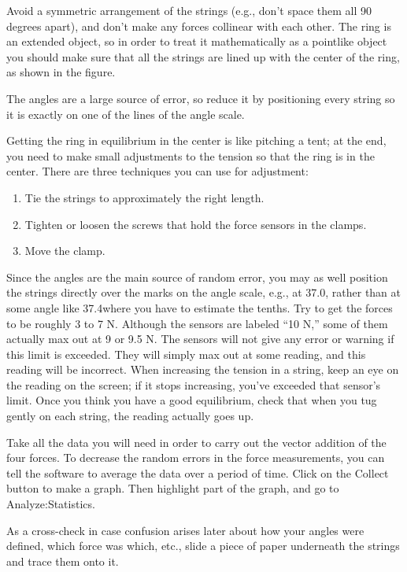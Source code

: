 
Avoid a symmetric arrangement of
the strings (e.g., don't space them all 90 degrees apart), and
don't make any forces collinear with each other. 
The ring is an extended object, so in order to treat it
mathematically as a pointlike object you should make sure
that all the strings are lined up with the center of the
ring, as shown in the figure.

The angles are a large source of error, so reduce it by positioning every string so it is exactly 
on one of the lines of the angle scale.

Getting the ring in equilibrium in the center is like pitching a tent; at the end, you need
to make small adjustments to the tension so that the ring is in the center.
There are three techniques you can use for
adjustment:

\begin{enumerate}
\item Tie the strings to approximately the right length.
\item Tighten or loosen the screws that hold the force sensors in the clamps.
\item Move the clamp.
\end{enumerate}

Since the angles are the main source
of random error, you may as well position the strings directly over the marks on the angle scale,
e.g., at 37.0\degunit, rather than at some angle like 37.4\degunit where you have to estimate the tenths.
Try to get the forces to be roughly 3 to 7 N.
Although the sensors are labeled ``10 N,'' some of them actually max out at 9 or 9.5 N.
The sensors will not give any
error or warning if this limit is exceeded. They will simply max out at some
reading, and this reading will be incorrect. When increasing the tension in a string, keep an eye
on the reading on the screen; if it stops increasing, you've exceeded that sensor's limit.
Once you think you have a good equilibrium, check that when you tug gently on each string, the
reading actually goes up.

Take all the data you will need in order to carry out the vector addition of the four forces.
To decrease the random errors in the force measurements, you can tell the software to average
the data over a period of time. Click on the Collect button to make a graph.
Then highlight part of the graph, and go to Analyze:Statistics.

As a cross-check in case confusion arises later about how your angles were defined, which
force was which, etc., slide a piece of paper underneath the strings and trace them onto it.

